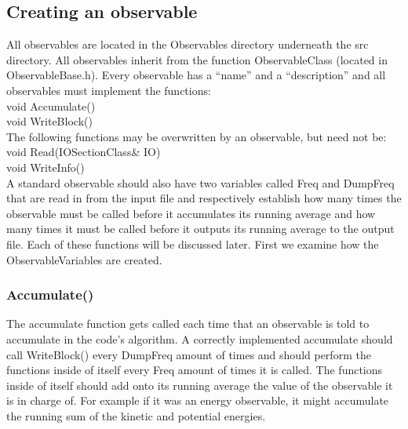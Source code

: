 \documentclass{book}
\begin{document}
\subsection{Creating an observable}
All observables are located in the Observables directory underneath
the src directory. All observables inherit from the function
ObservableClass (located in ObservableBase.h). Every observable has a
``name'' and a ``description'' and all
observables must implement the functions: \\
void Accumulate() \\
void WriteBlock() \\ 
The following functions may be overwritten by an observable, but need
not be: \\
void Read(IOSectionClass& IO) \\
void WriteInfo() \\
A standard observable should also have two variables called Freq and
DumpFreq that are read in from the input file and respectively
establish how many times the observable must be called before it
accumulates its running average and how many times it must be called
before it outputs its running average to the output file.
Each of these functions will be discussed later.  First we examine how
the ObservableVariables are created.
\subsubsection{Accumulate()}
The accumulate function gets called each time that an observable is
told to accumulate in the code's algorithm.  A correctly implemented
accumulate should call WriteBlock() every DumpFreq amount of times and
should perform the functions inside of itself every Freq amount of
times it is called.  The functions inside of itself should add onto
its running average the value of the observable it is in charge
of. For example if it was an energy observable, it might accumulate
the running sum of the kinetic and potential energies.
\end{document}
